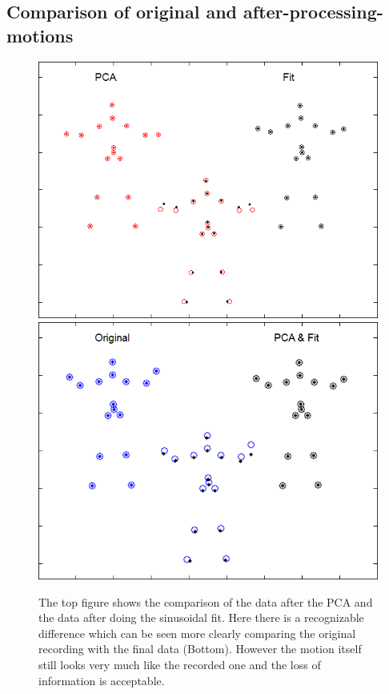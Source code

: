 \documentclass[a4paper]{article}
\begin{document}
\subsection{Comparison of original and after-processing-motions}

\begin{figure}
		\centering
		\includegraphics[height=0.3\textheight]{comparison_PCA_Fit.png}
		\includegraphics[height=0.3\textheight]{comparison_alles.png}
		\caption{The top figure shows the comparison of the data after the PCA and the data after doing the sinusoidal fit.
		Here there is a recognizable difference which can be seen more clearly comparing the original recording with the final data (Bottom).
		However the motion itself still looks very much like the recorded one and the loss of information is acceptable.
		}
		\label{fig:orig_pca}
\end{figure}
\end{document}
